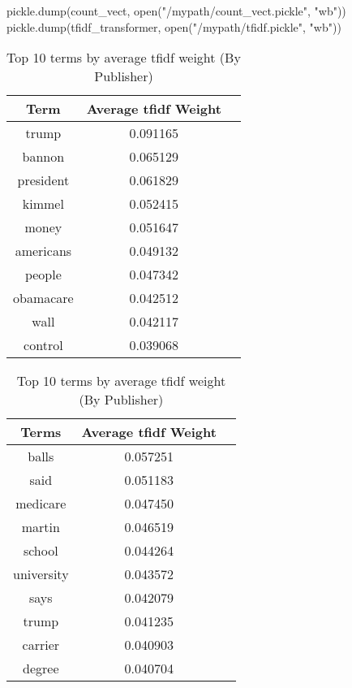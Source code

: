 \documentclass[a4paper, 11pt,titlepage,oneside,openany]{book}
\begin{document}
\begin{algorithm}
	\caption{pickle.dump}
	\label{pickle}
	\begin{algorithmic}
	\STATE pickle.dump(count\_vect, open("/mypath/count\_vect.pickle", "wb")) \\
	\STATE pickle.dump(tfidf\_transformer, open("/mypath/tfidf.pickle", "wb"))
	\end{algorithmic}
\end{algorithm}

\newpage
\begin{table}[t]
	\begin{minipage}{.5\textwidth}
		\begin{tabular}{ccc}
			\toprule
			Term & Average \Gls{tfidf} Weight \\
			\midrule
			trump & 0.091165 \\
			bannon & 0.065129 \\
			president & 0.061829 \\
			kimmel & 0.052415 \\
			money & 0.051647 \\
			americans & 0.049132 \\
			people & 0.047342 \\
			obamacare & 0.042512 \\
			wall & 0.042117 \\
			control & 0.039068 \\
			\bottomrule
		\end{tabular}
		\caption{Top 10 terms by average \Gls{tfidf} weight (By Article)}
	\end{minipage}
	\hspace{0,8cm}
	\begin{minipage}{.5\textwidth}
		\begin{tabular}{ccc}
			\toprule
			Terms & Average \Gls{tfidf} Weight \\
			\midrule
			balls & 0.057251 \\
			said & 0.051183 \\
			medicare & 0.047450 \\
			martin & 0.046519 \\
			school & 0.044264 \\
			university & 0.043572 \\
			says & 0.042079 \\
			trump & 0.041235 \\
			carrier & 0.040903 \\
			degree & 0.040704 \\
			\bottomrule
		\end{tabular}
		\caption{Top 10 terms by average \Gls{tfidf} weight (By Publisher)}
	\end{minipage}
\end{table}
\end{document}
